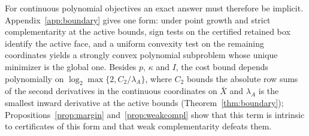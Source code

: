 For continuous polynomial objectives an exact answer must therefore be
implicit. Appendix~\ref{app:boundary} gives one form: under point growth and
strict complementarity at the active bounds, sign tests on the certified
retained box identify the active face, and a uniform convexity test on the
remaining coordinates yields a strongly convex polynomial subproblem whose
unique minimizer is the global one. Besides $p$, $\kappa$ and $I$, the cost
bound depends polynomially on $\log_2\max\{2,C_2/\lambda_A\}$, where $C_2$
bounds the absolute row sums of the second derivatives in the continuous
coordinates on $\bar X$ and $\lambda_A$ is the smallest inward derivative at
the active bounds (Theorem~\ref{thm:boundary}); Propositions~\ref{prop:margin}
and~\ref{prop:weakcompl} show that this term is intrinsic to certificates of
this form and that weak complementarity defeats them.
